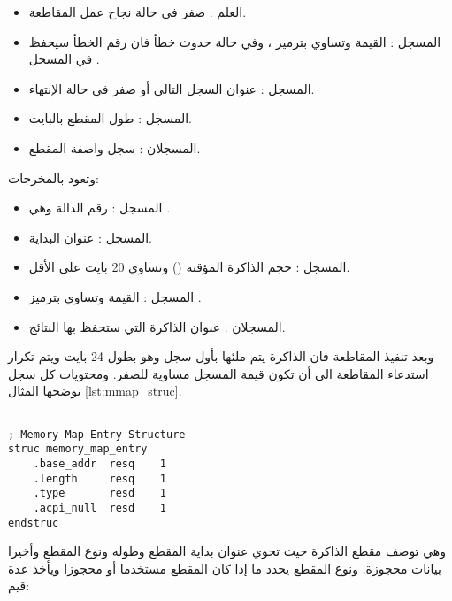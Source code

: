 \documentclass[document.tex]{subfiles}
\begin{document}
\begin{itemize}
\item العلم : صفر في حالة نجاح عمل المقاطعة.
\item المسجل : القيمة  وتساوي  بترميز ، وفي حالة حدوث خطأ فان رقم الخطأ سيحفظ في المسجل .
\item المسجل : عنوان السجل التالي أو صفر في حالة الإنتهاء.
\item المسجل : طول المقطع بالبايت.
\item المسجلان : سجل واصفة المقطع.

\end{itemize}

وتعود بالمخرجات:
\begin{itemize}
\item المسجل : رقم الدالة وهي .
\item المسجل : عنوان البداية.
\item المسجل : حجم الذاكرة المؤقتة () وتساوي 20 بايت على الأقل.
\item المسجل : القيمة  وتساوي  بترميز .
\item المسجلان : عنوان الذاكرة  التي ستحفظ بها النتائج.
\end{itemize}

وبعد تنفيذ المقاطعة فان الذاكرة  يتم ملئها بأول سجل وهو بطول 24 بايت ويتم تكرار استدعاء المقاطعة الى أن تكون قيمة المسجل  مساوية للصفر. ومحتويات كل سجل يوضحها المثال \ref{lst:mmap_struc}.

\begin{english}
\lstset{numberstyle=\tiny,numbers=left,stepnumber=1,numbersep=5pt,tabsize=2,extendedchars=true,breaklines=true,frame=b,showspaces=false, showtabs=false,xleftmargin=10pt,framexleftmargin=10pt,framexrightmargin=5pt,framexbottommargin=4pt,showstringspaces=false,language=[x86masm]Assembler}

\begin{lstlisting}[label=lst:mmap_struc,caption=\en{Memory Map Entry Structure}]

; Memory Map Entry Structure
struc memory_map_entry
	.base_addr	resq	1
	.length		resq	1
	.type		resd	1
	.acpi_null	resd	1
endstruc
\end{lstlisting}
\end{english}

وهي توصف مقطع الذاكرة حيث تحوي عنوان بداية المقطع وطوله ونوع المقطع وأخيرا بيانات محجوزة. ونوع المقطع يحدد ما إذا كان المقطع مستخدما أو محجوزا ويأخذ عدة قيم:
\end{document}
